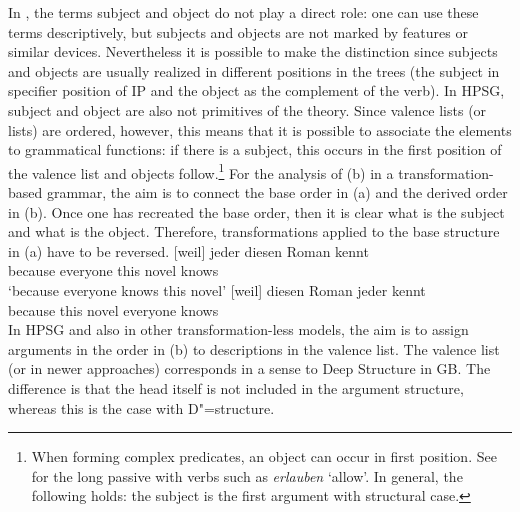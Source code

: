In \gbt, the terms subject and object do not play a direct role: one can use
these terms descriptively, but subjects and objects are not marked by features or similar
devices. Nevertheless it is possible to make the distinction since subjects and objects are usually
realized in different positions in the trees (the subject in specifier position of IP and the object as the complement of the verb). In HPSG, subject and object
are also not primitives of the theory. Since valence lists (or \argst lists) are ordered, however,
this means that it is possible to associate the \argst elements to grammatical functions:
if there is a subject, this occurs in the first position of the valence list and objects follow.\footnote{%
	When forming complex predicates, an object can occur in first position. See  for the long passive with verbs such as \emph{erlauben}
          `allow'. In general, the following holds: the subject is the first argument with structural case.%
} 
For the analysis of (b)  in a transformation-based grammar, the aim is to connect the base order in (a) and the derived order in (b).
Once one has recreated the base order, then it is clear what is the subject and what is the object. Therefore, transformations applied to the base
structure in (a) have to be reversed.
\eal
\ex 
\gll {}[weil] jeder diesen Roman kennt\\
	 {}\spacebr{}because everyone this novel knows\\
\glt `because everyone knows this novel'
\ex 
\gll {}[weil] diesen Roman jeder kennt\\
	 {}\spacebr{}because this novel everyone knows\\
\zl
In HPSG and also in other transformation-less models, the aim is to assign arguments in the order in (b) to descriptions
in the valence list. The valence list (or \argst in newer approaches) corresponds in a sense to Deep Structure in GB.
The difference is that the head itself is not included in the argument structure, whereas this is the case with D"=structure.

